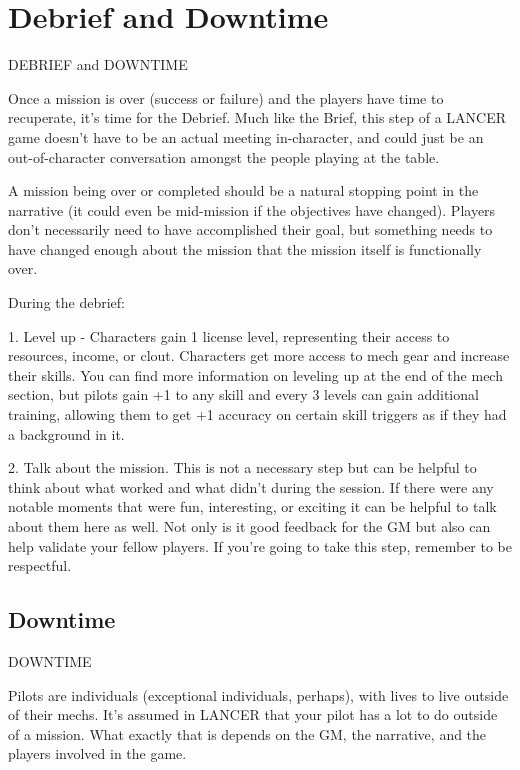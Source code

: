 \section{Debrief and Downtime}

                      DEBRIEF and DOWNTIME


Once a mission is over (success or failure) and the players have time to recuperate, it’s time for
the Debrief. Much like the Brief, this step of a LANCER game doesn’t have to be an actual
meeting in-character, and could just be an out-of-character conversation amongst the people
playing at the table.


A mission being over or completed should be a natural stopping point in the narrative (it could
even be mid-mission if the objectives have changed). Players don’t necessarily need to have
accomplished their goal, but something needs to have changed enough about the mission that
the mission itself is functionally over.


During the debrief:

	        1. Level up - Characters gain 1 license level, representing their access to resources,
income, or clout. Characters get more access to mech gear and increase their skills. You can find
more information on leveling up at the end of the mech section, but pilots gain +1 to any skill and
every 3 levels can gain additional training, allowing them to get +1 accuracy on certain skill
triggers as if they had a background in it.

	        2. Talk about the mission. This is not a necessary step but can be helpful to think about
what worked and what didn’t during the session. If there were any notable moments that were
fun, interesting, or exciting it can be helpful to talk about them here as well. Not only is it good
feedback for the GM but also can help validate your fellow players. If you’re going to take this
step, remember to be respectful.


\subsection{Downtime}
                                             DOWNTIME


Pilots are individuals (exceptional individuals, perhaps), with lives to live outside of their mechs.
It’s assumed in LANCER that your pilot has a lot to do outside of a mission. What exactly that is
depends on the GM, the narrative, and the players involved in the game.


